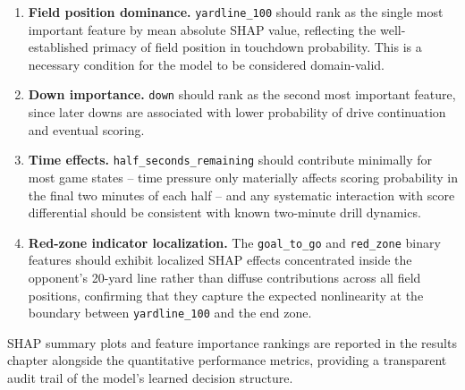 \begin{enumerate}
  \item \textbf{Field position dominance.} \texttt{yardline\_100} should rank
        as the single most important feature by mean absolute SHAP value,
        reflecting the well-established primacy of field position in
        touchdown probability. This is a necessary condition for the model to
        be considered domain-valid.

  \item \textbf{Down importance.} \texttt{down} should rank as the second
        most important feature, since later downs are associated with lower
        probability of drive continuation and eventual scoring.

  \item \textbf{Time effects.} \texttt{half\_seconds\_remaining} should
        contribute minimally for most game states -- time pressure only
        materially affects scoring probability in the final two minutes of
        each half -- and any systematic interaction with score differential
        should be consistent with known two-minute drill dynamics.

  \item \textbf{Red-zone indicator localization.} The \texttt{goal\_to\_go}
        and \texttt{red\_zone} binary features should exhibit localized SHAP
        effects concentrated inside the opponent's 20-yard line rather than
        diffuse contributions across all field positions, confirming that they
        capture the expected nonlinearity at the boundary between
        \texttt{yardline\_100} and the end zone.
\end{enumerate}

SHAP summary plots and feature importance rankings are reported in the
results chapter alongside the quantitative performance metrics, providing
a transparent audit trail of the model's learned decision structure.

